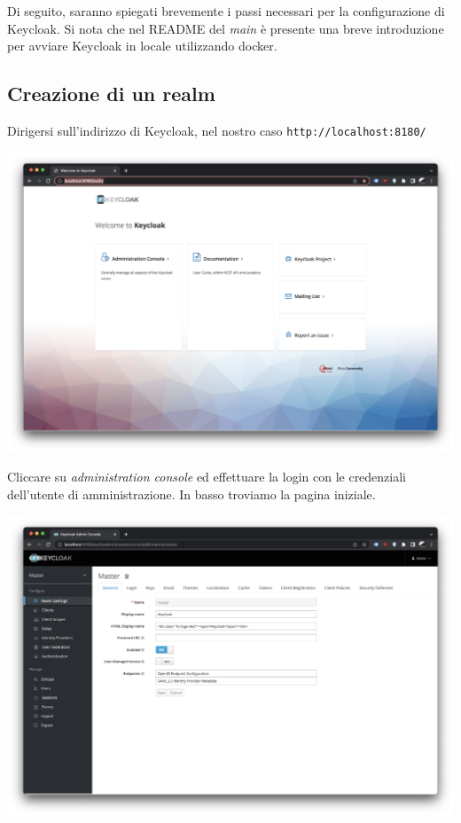 \documentclass{article}
\begin{document}
Di seguito, saranno spiegati brevemente i passi necessari per la configurazione di Keycloak. Si nota che nel README del \textit{main} è presente una breve introduzione per avviare Keycloak in locale utilizzando docker.

\subsection{Creazione di un realm}

Dirigersi sull'indirizzo di Keycloak, nel nostro caso \texttt{http://localhost:8180/}

\begin{center}
    \includegraphics[width=0.80\linewidth]{keycloak_01.png}
\end{center}

Cliccare su \textit{administration console} ed effettuare la login con le credenziali dell'utente di amministrazione. In basso
troviamo la pagina iniziale.

\begin{center}
    \includegraphics[width=0.80\linewidth]{keycloak_02.png}
\end{center}
\end{document}
